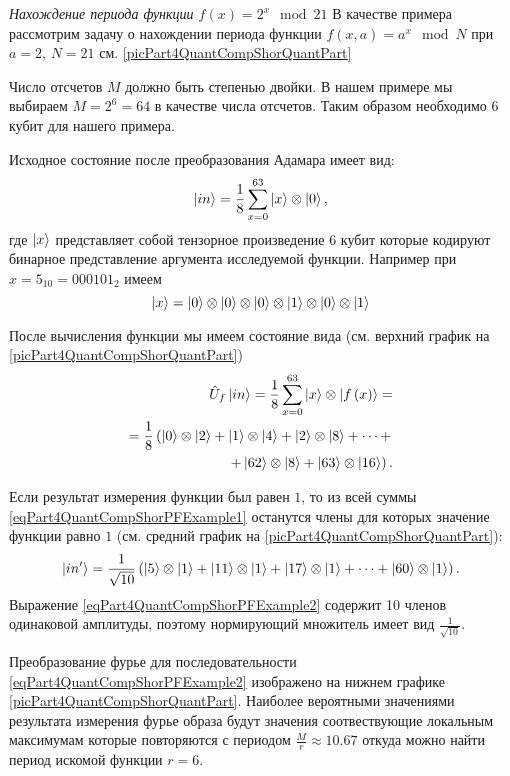 \begin{example}
\emph{Нахождение периода функции $f\left(x\right) = 2^x \mod 21$}
\label{exPart4QuantCompShorQuantPeriodFinding}
В качестве примера рассмотрим задачу о нахождении периода функции 
$f\left(x, a\right) = a^x \mod{N}$ при $a=2$, $N = 21$ см. 
\autoref{picPart4QuantCompShorQuantPart}

Число отсчетов  $M$ должно быть степенью двойки. В нашем примере мы
выбираем $M = 2^6 = 64$ в качестве числа отсчетов. Таким образом
необходимо 6 кубит для нашего примера.

Исходное состояние после  преобразования Адамара имеет вид:
\begin{equation}
\ket{in} = \frac{1}{8}\sum_{x = 0}^{63}\ket{x} \otimes \ket{0},
\nonumber
\end{equation}
где $\ket{x}$ представляет собой тензорное произведение 
6 кубит
которые кодируют бинарное представление аргумента исследуемой
функции. Например при $x=5_{10}=000101_2$ имеем
\[
\ket{x} = \ket{0}\otimes \ket{0}\otimes
\ket{0}\otimes 
\ket{1}\otimes \ket{0}\otimes \ket{1}
\]

После вычисления функции мы имеем состояние вида (см. верхний график
на \autoref{picPart4QuantCompShorQuantPart})
\begin{eqnarray}
\hat{U}_f\ket{in} = \frac{1}{8}\sum_{x = 0}^{63}\ket{x}
\otimes \left|f\left(x\right)\right> = 
\nonumber \\
=
\frac{1}{8}
\left(
\ket{0}\otimes\ket{2} + 
\ket{1}\otimes\ket{4} + 
\ket{2}\otimes\ket{8} + \dots +
\right.
\nonumber \\
\left.
+
\ket{62}\otimes\ket{8} +
\ket{63}\otimes\ket{16}
\right).
\label{eqPart4QuantCompShorPFExample1}
\end{eqnarray}

Если результат измерения функции был равен $1$, то из всей суммы
\eqref{eqPart4QuantCompShorPFExample1} останутся члены для которых
значение функции равно $1$ (см. средний график
на \autoref{picPart4QuantCompShorQuantPart}):
\begin{equation}
\ket{in'} = \frac{1}{\sqrt{10}}\left( 
\ket{5}\otimes\ket{1} +
\ket{11}\otimes\ket{1} +
\ket{17}\otimes\ket{1} +
\dots +
\ket{60}\otimes\ket{1}
\right).
\label{eqPart4QuantCompShorPFExample2}
\end{equation} 
Выражение \eqref{eqPart4QuantCompShorPFExample2} содержит 10 членов
одинаковой амплитуды, поэтому нормирующий множитель имеет вид
$\frac{1}{\sqrt{10}}$.

Преобразование фурье для последовательности
\eqref{eqPart4QuantCompShorPFExample2} изображено на нижнем графике
\autoref{picPart4QuantCompShorQuantPart}. Наиболее вероятными
значениями результата измерения фурье образа будут значения
соотвествующие локальным максимумам которые повторяются с периодом 
$\frac{M}{r}\approx10.67$ откуда можно найти период искомой функции
$r=6$. 

\end{example}
